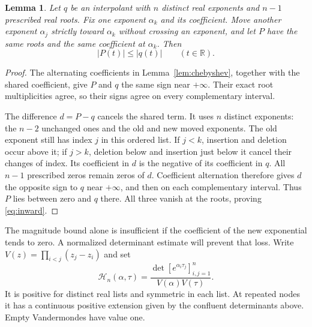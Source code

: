 \documentclass[11pt]{article}
\newtheorem{lemma}[theorem]{Lemma}
\theoremstyle{remark}
\newcommand{\R}{\mathbb R}
\begin{document}
\begin{lemma}\label{lem:inward}
Let $q$ be an interpolant with $n$ distinct real exponents and $n-1$
prescribed real roots. Fix one exponent $\alpha_k$ and its coefficient.
Move another exponent $\alpha_j$ strictly toward $\alpha_k$ without crossing
an exponent, and let $P$ have the same roots and the same coefficient at
$\alpha_k$. Then
\begin{equation}\label{eq:inward}
 |P(t)|\le|q(t)|\qquad(t\in\R).
\end{equation}
\end{lemma}
\begin{proof}
The alternating coefficients in Lemma~\ref{lem:chebyshev}, together with the
shared coefficient, give $P$ and $q$ the same sign near $+\infty$. Their
exact root multiplicities agree, so their signs agree on every complementary
interval.

The difference $d=P-q$ cancels the shared term. It uses $n$ distinct
exponents: the $n-2$ unchanged ones and the old and new moved exponents.
The old exponent still has index $j$ in this ordered list. If $j<k$, insertion
and deletion occur above it; if $j>k$, deletion below and insertion just below
it cancel their changes of index. Its coefficient in $d$ is the negative of
its coefficient in $q$. All $n-1$ prescribed zeros remain zeros of $d$.
Coefficient alternation therefore gives $d$ the opposite sign to $q$ near
$+\infty$, and then on each complementary interval. Thus $P$ lies between
zero and $q$ there. All three vanish at the roots, proving \eqref{eq:inward}.
\end{proof}

The magnitude bound alone is insufficient if the coefficient of the new
exponential tends to zero. A normalized determinant estimate will prevent
that loss. Write $V(z)=\prod_{i<j}(z_j-z_i)$ and set
\[
 \mathcal H_n(\alpha,\tau)
   =\frac{\det[e^{\alpha_i\tau_j}]_{i,j=1}^n}{V(\alpha)V(\tau)}.
\]
It is positive for distinct real lists and symmetric in each list. At repeated
nodes it has a continuous positive extension given by the confluent
determinants above. Empty Vandermondes have value one.
\end{document}
